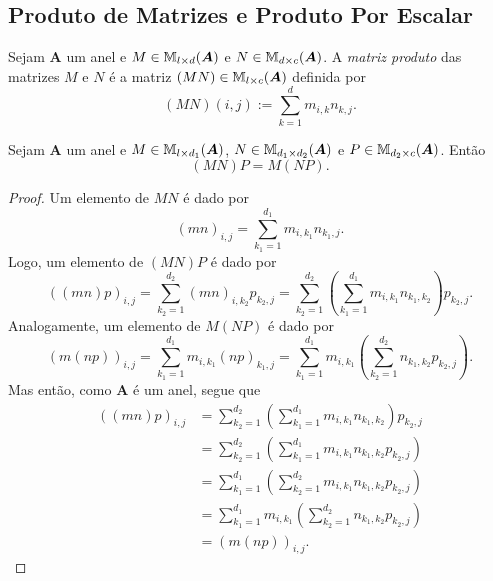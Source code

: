 \subsection{Produto de Matrizes e Produto Por Escalar}

\begin{defi}
	Sejam $\bm A$ um anel e $M \in \mathbb{M}_{l \times d}(\bm A)$ e $N \in \mathbb{M}_{d \times c}(\bm A)$. A \emph{matriz produto} das matrizes $M$ e $N$ é a matriz $(MN) \in \mathbb{M}_{l \times c}(\bm A)$ definida por
	\begin{equation*}
	(MN)(i,j) := \sum_{k=1}^d m_{i,k}n_{k,j}.
	\end{equation*}
\end{defi}

\begin{prop}
	Sejam $\bm A$ um anel e $M \in \mathbb{M}_{l \times d_1}(\bm A)$, $N \in \mathbb{M}_{d_1 \times d_2}(\bm A)$ e $P \in \mathbb{M}_{d_2 \times c}(\bm A)$. Então
	\begin{equation*}
	(MN)P = M(NP).
	\end{equation*}
\end{prop}
\begin{proof} Um elemento de $MN$ é dado por
	\begin{equation*}
	(mn)_{i,j} = \sum_{k_1=1}^{d_1} m_{i,k_1}n_{k_1,j}.
	\end{equation*}
Logo, um elemento de $(MN)P$ é dado por
	\begin{equation*}
	((mn)p)_{i,j} = \sum_{k_2=1}^{d_2} (mn)_{i,k_2}p_{k_2,j} = \sum_{k_2=1}^{d_2} \left(\sum_{k_1=1}^{d_1} m_{i,k_1}n_{k_1,k_2}\right)p_{k_2,j}.
	\end{equation*}
Analogamente, um elemento de $M(NP)$ é dado por
	\begin{equation*}
	(m(np))_{i,j} = \sum_{k_1=1}^{d_1} m_{i,k_1}(np)_{k_1,j} = \sum_{k_1=1}^{d_1} m_{i,k_1}\left(\sum_{k_2=1}^{d_2} n_{k_1,k_2}p_{k_2,j}\right).
	\end{equation*}
Mas então, como $\bm A$ é um anel, segue que
	\begin{align*}
	((mn)p)_{i,j}
	&= \sum_{k_2=1}^{d_2} \left(\sum_{k_1=1}^{d_1} m_{i,k_1}n_{k_1,k_2}\right)p_{k_2,j} \\
	&= \sum_{k_2=1}^{d_2} \left(\sum_{k_1=1}^{d_1} m_{i,k_1}n_{k_1,k_2}p_{k_2,j}\right) \\
	&= \sum_{k_1=1}^{d_1} \left(\sum_{k_2=1}^{d_2} m_{i,k_1}n_{k_1,k_2}p_{k_2,j}\right) \\
	&= \sum_{k_1=1}^{d_1} m_{i,k_1}\left(\sum_{k_2=1}^{d_2} n_{k_1,k_2}p_{k_2,j}\right) \\
	&= (m(np))_{i,j}.
	\end{align*}
\end{proof}


